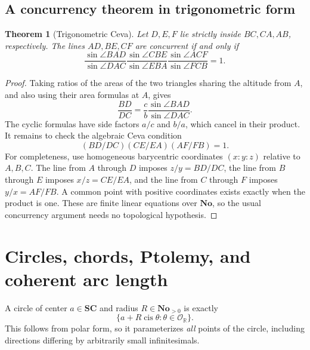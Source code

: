\documentclass[11pt,letterpaper]{article}
\newtheorem{theorem}{Theorem}[section]
\theoremstyle{definition}
\theoremstyle{remark}
\newcommand{\No}{\mathbf{No}}
\newcommand{\SC}{\mathbf{SC}}
\newcommand{\R}{\mathbb R}\newcommand{\C}{\mathbb C}
\newcommand{\OO}{\mathcal O}\newcommand{\mm}{\mathfrak m}
\newcommand{\cis}{\operatorname{cis}}
\numberwithin{equation}{section}
\begin{document}
\subsection{A concurrency theorem in trigonometric form}
\begin{theorem}[Trigonometric Ceva]\label{thm:ceva}
Let $D,E,F$ lie strictly inside $BC,CA,AB$, respectively. The lines $AD,BE,CF$ are concurrent if and only if
\begin{equation}\label{eq:ceva}
 \frac{\sin\angle BAD}{\sin\angle DAC}
 \frac{\sin\angle CBE}{\sin\angle EBA}
 \frac{\sin\angle ACF}{\sin\angle FCB}=1.
\end{equation}
\end{theorem}
\begin{proof}
Taking ratios of the areas of the two triangles sharing the altitude from $A$, and also using their area formulas at $A$, gives
\[
 \frac{BD}{DC}=\frac cb\frac{\sin\angle BAD}{\sin\angle DAC}.
\]
The cyclic formulas have side factors $a/c$ and $b/a$, which cancel in their product. It remains to check the algebraic Ceva condition
\[
 (BD/DC)(CE/EA)(AF/FB)=1.
\]
For completeness, use homogeneous barycentric coordinates $(x:y:z)$ relative to $A,B,C$. The line from $A$ through $D$ imposes $z/y=BD/DC$, the line from $B$ through $E$ imposes $x/z=CE/EA$, and the line from $C$ through $F$ imposes $y/x=AF/FB$. A common point with positive coordinates exists exactly when the product is one. These are finite linear equations over $\No$, so the usual concurrency argument needs no topological hypothesis.
\end{proof}

\section{Circles, chords, Ptolemy, and coherent arc length}\label{sec:circles}
A circle of center $a\in\SC$ and radius $R\in\No_{>0}$ is exactly
\[
 \{a+R\cis\theta:\theta\in\OO_{\R}\}.
\]
This follows from polar form, so it parameterizes \emph{all} points of the circle, including directions differing by arbitrarily small infinitesimals.
\end{document}
